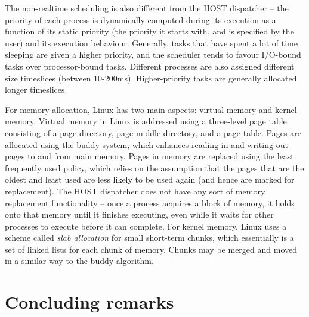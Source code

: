 \documentclass[12pt]{article}
\begin{document}
The non-realtime scheduling is also different from the HOST dispatcher --
the priority of each process is dynamically computed during its execution as
a function of its static priority (the priority it starts with, and is 
specified by the user) and its execution behaviour. Generally, tasks that have
spent a lot of time sleeping are given a higher priority, and the scheduler
tends to favour I/O-bound tasks over processor-bound tasks. Different processes
are also assigned different size timeslices (between 10-200ms). Higher-priority
tasks are generally allocated longer timeslices.

For memory allocation, Linux has two main aspects: virtual memory and kernel
memory. Virtual memory in Linux is addressed using a three-level page table
consisting of a page directory, page middle directory, and a page table. Pages
are allocated using the buddy system, which enhances reading in and writing out
pages to and from main memory. Pages in memory are replaced using the least
frequently used policy, which relies on the assumption that the pages that are
the oldest and least used are less likely to be used again (and hence are
marked for replacement). The HOST dispatcher does not have any sort of
memory replacement functionality -- once a process acquires a block of memory,
it holds onto that memory until it finishes executing, even while it waits for
other processes to execute before it can complete. For kernel memory, Linux
uses a scheme called \textit{slab allocation} for small short-term chunks,
which essentially is a set of linked lists for each chunk of memory. Chunks may
be merged and moved in a similar way to the buddy algorithm.

\section{Concluding remarks}



\end{document}
